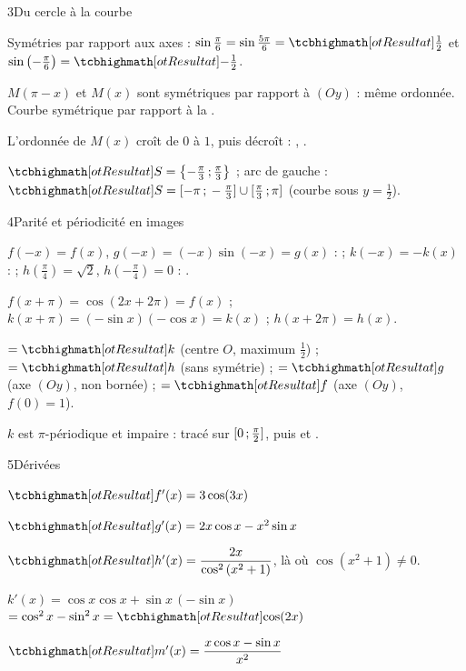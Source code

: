 \begin{deuxcolonnes}
\begin{corrige}{3}{Du cercle à la courbe}
\begin{questions}
  \item Symétries par rapport aux axes : $\sin\frac{\pi}{6}=\sin\frac{5\pi}{6}=\res{\frac12}$ et
    $\sin\left(-\frac{\pi}{6}\right)=\res{-\frac12}$.
  \item $M(\pi-x)$ et $M(x)$ sont symétriques par rapport à $(Oy)$ : même ordonnée. Courbe symétrique par rapport à la
    .
  \item L'ordonnée de $M(x)$ croît de $0$ à $1$, puis décroît : ,
    .
  \item $\res{S=\ens{-\frac{\pi}{3}\pv\frac{\pi}{3}}}$ ; arc de gauche :
    $\res{S=\intFF{-\pi}{-\frac{\pi}{3}}\cup\intFF{\frac{\pi}{3}}{\pi}}$ (courbe sous $y=\frac12$).
\end{questions}
\end{corrige}

\begin{corrige}{4}{Parité et périodicité en images}
\begin{questions}
  \item $f(-x)=f(x)$, $g(-x)=(-x)\sin(-x)=g(x)$ :  ; $k(-x)=-k(x)$ :  ;
    $h\left(\frac{\pi}{4}\right)=\sqrt2$, $h\left(-\frac{\pi}{4}\right)=0$ : .
  \item $f(x+\pi)=\cos(2x+2\pi)=f(x)$ ; $k(x+\pi)=(-\sin x)(-\cos x)=k(x)$ ; $h(x+2\pi)=h(x)$.
  \item {} $=\res{k}$ (centre $O$, maximum $\frac12$) ;  $=\res{h}$ (sans
    symétrie) ;  $=\res{g}$ (axe $(Oy)$, non bornée) ;  $=\res{f}$ (axe $(Oy)$,
    $f(0)=1$).
  \item $k$ est $\pi$-périodique et impaire : tracé sur $\mathopen{[}0\,{;}\,\frac{\pi}{2}\mathclose{]}$, puis 
    et .
\end{questions}
\end{corrige}

\begin{corrige}{5}{Dérivées}
\begin{questions}
  \item $\res{f'(x)=3\cos(3x)}$
  \item $\res{g'(x)=2x\cos x-x^{2}\sin x}$
  \item $\res{h'(x)=\dfrac{2x}{\cos^{2}\left(x^{2}+1\right)}}$, là où $\cos\left(x^{2}+1\right)\neq0$.
  \item $k'(x)=\cos x\cos x+\sin x\,(-\sin x)$\\ $=\cos^{2}x-\sin^{2}x=\res{\cos(2x)}$
  \item $\res{m'(x)=\dfrac{x\cos x-\sin x}{x^{2}}}$
\end{questions}
\end{corrige}


\end{deuxcolonnes}
